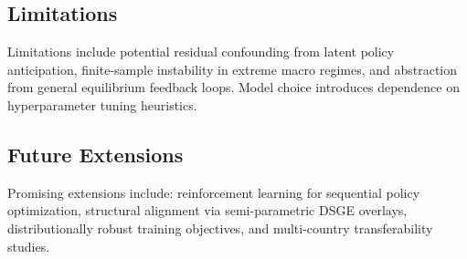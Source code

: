 \subsection{Limitations}
Limitations include potential residual confounding from latent policy anticipation, finite-sample instability in extreme macro regimes, and abstraction from general equilibrium feedback loops. Model choice introduces dependence on hyperparameter tuning heuristics.

\subsection{Future Extensions}
Promising extensions include: reinforcement learning for sequential policy optimization, structural alignment via semi-parametric DSGE overlays, distributionally robust training objectives, and multi-country transferability studies.
